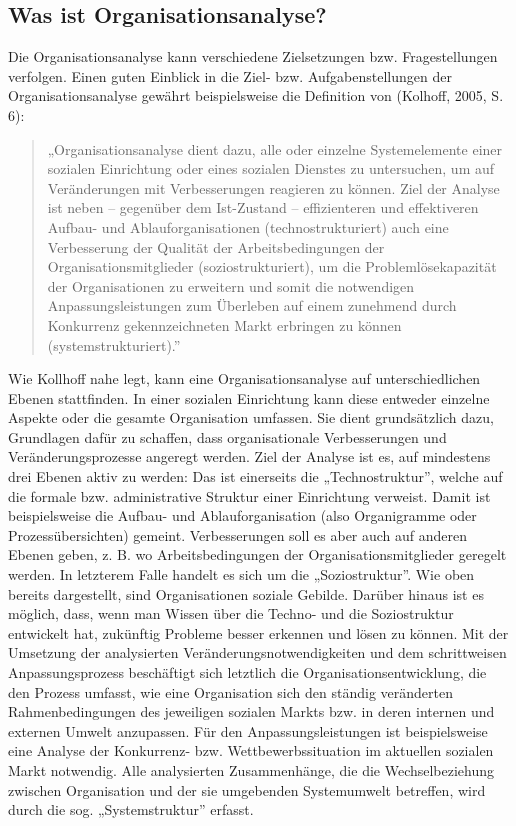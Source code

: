 \documentclass[
  letterpaper,
]{book}
\begin{document}
\subsection{Was ist
Organisationsanalyse?}\label{was-ist-organisationsanalyse}

Die Organisationsanalyse kann verschiedene Zielsetzungen bzw.
Fragestellungen verfolgen. Einen guten Einblick in die Ziel- bzw.
Aufgabenstellungen der Organisationsanalyse gewährt beispielsweise die
Definition von (Kolhoff, 2005, S. 6):

\begin{quote}
„Organisationsanalyse dient dazu, alle oder einzelne Systemelemente
einer sozialen Einrichtung oder eines sozialen Dienstes zu untersuchen,
um auf Veränderungen mit Verbesserungen reagieren zu können. Ziel der
Analyse ist neben -- gegenüber dem Ist-Zustand -- effizienteren und
effektiveren Aufbau- und Ablauforganisationen (technostrukturiert) auch
eine Verbesserung der Qualität der Arbeitsbedingungen der
Organisationsmitglieder (soziostrukturiert), um die Problemlösekapazität
der Organisationen zu erweitern und somit die notwendigen
Anpassungsleistungen zum Überleben auf einem zunehmend durch Konkurrenz
gekennzeichneten Markt erbringen zu können (systemstrukturiert).''
\end{quote}

Wie Kollhoff nahe legt, kann eine Organisationsanalyse auf
unterschiedlichen Ebenen stattfinden. In einer sozialen Einrichtung kann
diese entweder einzelne Aspekte oder die gesamte Organisation umfassen.
Sie dient grundsätzlich dazu, Grundlagen dafür zu schaffen, dass
organisationale Verbesserungen und Veränderungsprozesse angeregt werden.
Ziel der Analyse ist es, auf mindestens drei Ebenen aktiv zu werden: Das
ist einerseits die „Technostruktur'', welche auf die formale bzw.
administrative Struktur einer Einrichtung verweist. Damit ist
beispielsweise die Aufbau- und Ablauforganisation (also Organigramme
oder Prozessübersichten) gemeint. Verbesserungen soll es aber auch auf
anderen Ebenen geben, z. B. wo Arbeitsbedingungen der
Organisationsmitglieder geregelt werden. In letzterem Falle handelt es
sich um die „Soziostruktur''. Wie oben bereits dargestellt, sind
Organisationen soziale Gebilde. Darüber hinaus ist es möglich, dass,
wenn man Wissen über die Techno- und die Soziostruktur entwickelt hat,
zukünftig Probleme besser erkennen und lösen zu können. Mit der
Umsetzung der analysierten Veränderungsnotwendigkeiten und dem
schrittweisen Anpassungsprozess beschäftigt sich letztlich die
Organisationsentwicklung, die den Prozess umfasst, wie eine Organisation
sich den ständig veränderten Rahmenbedingungen des jeweiligen sozialen
Markts bzw. in deren internen und externen Umwelt anzupassen. Für den
Anpassungsleistungen ist beispielsweise eine Analyse der Konkurrenz-
bzw. Wettbewerbssituation im aktuellen sozialen Markt notwendig. Alle
analysierten Zusammenhänge, die die Wechselbeziehung zwischen
Organisation und der sie umgebenden Systemumwelt betreffen, wird durch
die sog. „Systemstruktur'' erfasst.
\end{document}

